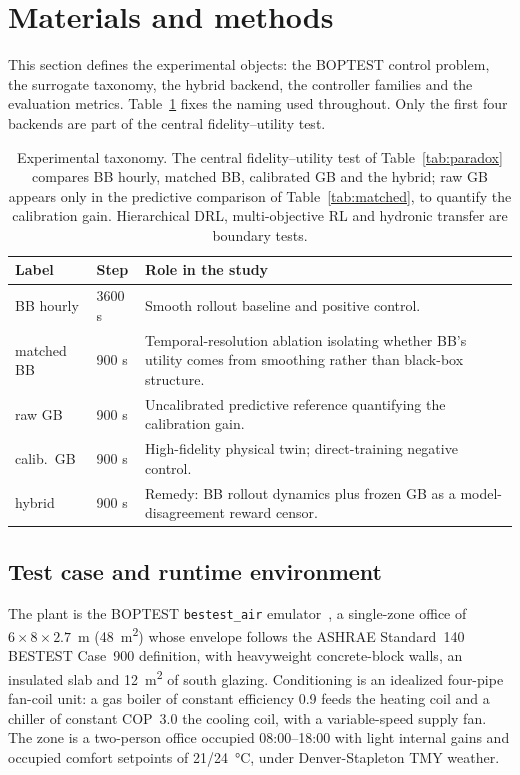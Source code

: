\section{Materials and methods}\label{sec:methods}

This section defines the experimental objects: the BOPTEST control problem, the surrogate taxonomy,
the hybrid backend, the controller families and the evaluation metrics. Table~\ref{tab:taxonomy}
fixes the naming used throughout. Only the first four backends are part of the central
fidelity--utility test.

\begin{table}[H]
\centering
\small
\begin{tabularx}{\linewidth}{@{}p{14mm}p{13mm}X@{}}
\toprule
Label & Step & Role in the study \\
\midrule
BB hourly & 3600 s & Smooth rollout baseline and positive control. \\
matched BB & 900 s & Temporal-resolution ablation isolating whether BB's utility comes from smoothing rather than black-box structure. \\
raw GB & 900 s & Uncalibrated predictive reference quantifying the calibration gain. \\
calib.\ GB & 900 s & High-fidelity physical twin; direct-training negative control. \\
hybrid & 900 s & Remedy: BB rollout dynamics plus frozen GB as a model-disagreement reward censor. \\
\bottomrule
\end{tabularx}
\caption{Experimental taxonomy. The central fidelity--utility test of Table~\ref{tab:paradox}
compares BB hourly, matched BB, calibrated GB and the hybrid; raw GB appears only in the predictive
comparison of Table~\ref{tab:matched}, to quantify the calibration gain. Hierarchical DRL,
multi-objective RL and hydronic transfer are boundary tests.}
\label{tab:taxonomy}
\end{table}

\subsection{Test case and runtime environment}\label{ssec:testcase}
The plant is the BOPTEST \texttt{bestest\_air} emulator~\cite{Blum2021BOPTEST,Wetter2014Modelica}, a
single-zone office of $6\times8\times2.7$~m (\SI{48}{\meter\squared}) whose envelope follows the
ASHRAE Standard~140 BESTEST Case~900 definition, with heavyweight concrete-block walls, an insulated
slab and \SI{12}{\meter\squared} of south glazing. Conditioning is an idealized four-pipe fan-coil
unit: a gas boiler of constant efficiency 0.9 feeds the heating coil and a chiller of constant
COP~3.0 the cooling coil, with a variable-speed supply fan. The zone is a two-person office occupied
08:00--18:00 with light internal gains and occupied comfort setpoints of 21/\SI{24}{\celsius}, under
Denver-Stapleton TMY weather.


